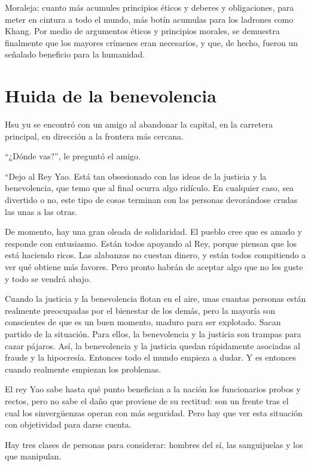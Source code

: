 \documentclass[hidelinks]{memoir}
\begin{document}
	Moraleja: cuanto más acumules principios éticos y deberes y
	obligaciones, para meter en cintura a todo el mundo, más botín acumulas
	para los ladrones como Khang. Por medio de argumentos éticos y
	principios morales, se demuestra finalmente que los mayores crímenes
	eran necesarios, y que, de hecho, fueron un señalado beneficio para la
	humanidad.
	
	\chapter*{Huida de la benevolencia}
	
	Hsu yu se encontró con un amigo al abandonar la capital, en la carretera
	principal, en dirección a la frontera más cercana.
	
	``¿Dónde vas?'', le preguntó el amigo.
	
	``Dejo al Rey Yao. Está tan obsesionado con las ideas de la justicia y
	la benevolencia, que temo que al final ocurra algo ridículo. En
	cualquier caso, sea divertido o no, este tipo de cosas terminan con las
	personas devorándose crudas las unas a las otras.
	
	De momento, hay una gran oleada de solidaridad. El pueblo cree que es
	amado y responde con entusiasmo. Están todos apoyando al Rey, porque
	piensan que los está haciendo ricos. Las alabanzas no cuestan dinero, y
	están todos compitiendo a ver qué obtiene más favores. Pero pronto
	habrán de aceptar algo que no les guste y todo se vendrá abajo.
	
	Cuando la justicia y la benevolencia flotan en el aire, unas cuantas
	personas están realmente preocupadas por el bienestar de los demás, pero
	la mayoría son conscientes de que es un buen momento, maduro para ser
	explotado. Sacan partido de la situación. Para ellos, la benevolencia y
	la justicia son trampas para cazar pájaros. Así, la benevolencia y la
	justicia quedan rápidamente asociadas al fraude y la hipocresía.
	Entonces todo el mundo empieza a dudar. Y es entonces cuando realmente
	empiezan los problemas.
	
	El rey Yao sabe hasta qué punto benefician a la nación los funcionarios
	probos y rectos, pero no sabe el daño que proviene de su rectitud: son
	un frente tras el cual los sinvergüenzas operan con más seguridad. Pero
	hay que ver esta situación con objetividad para darse cuenta.
	
	Hay tres clases de personas para considerar: hombres del sí, las
	sanguijuelas y los que manipulan.
	
\end{document}
